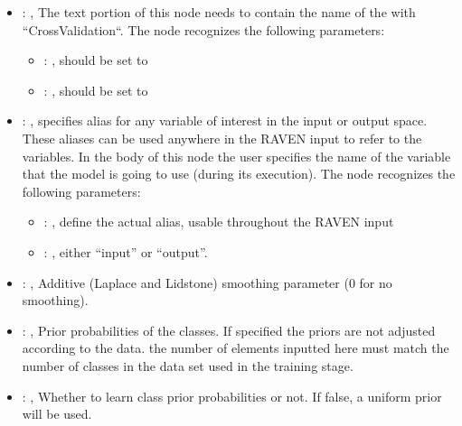 \begin{itemize}
\begin{itemize}
        \item {}: ,
          List of IDs of features/variables to include in the transformation process.

        \item {}: ,
          Which space to search? Target or Feature?
      \end{itemize}

    \item {}: ,
      The text portion of this node needs to contain the name of the  with
               ``CrossValidation``.
      The  node recognizes the following parameters:
        \begin{itemize}
          \item {}: ,
            should be set to 
          \item {}: ,
            should be set to 
      \end{itemize}

    \item {}: ,
      specifies alias for         any variable of interest in the input or output space. These
      aliases can be used anywhere in the RAVEN input to         refer to the variables. In the body
      of this node the user specifies the name of the variable that the model is going to use
      (during its execution).
      The  node recognizes the following parameters:
        \begin{itemize}
          \item {}: ,
            define the actual alias, usable throughout the RAVEN input
          \item {}: ,
            either ``input'' or ``output''.
      \end{itemize}

    \item {}: ,
      Additive (Laplace and Lidstone) smoothing parameter (0 for no smoothing).

    \item {}: ,
      Prior probabilities of the classes. If specified the priors are
      not adjusted according to the data. \nb the number of elements inputted here must
      match the number of classes in the data set used in the training stage.

    \item {}: ,
      Whether to learn class prior probabilities or not. If false, a uniform
      prior will be used.
  \end{itemize}


